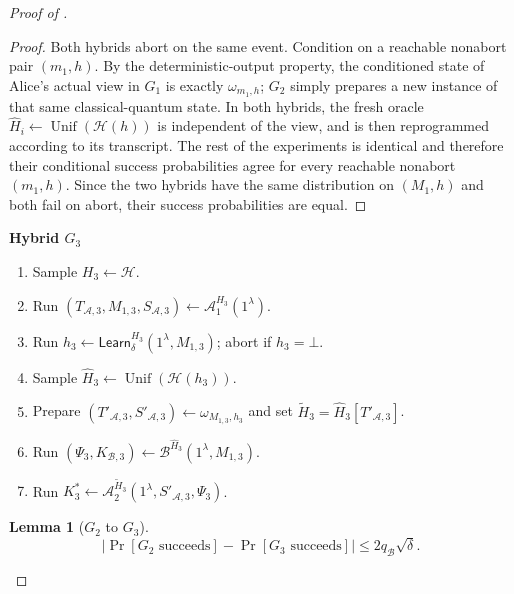 \documentclass[11pt]{article}
\newtheorem{lemma}[lemma]{Lemma}
\newcommand{\cA}{\mathcal{A}}
\newcommand{\cB}{\mathcal{B}}
\newcommand{\cH}{\mathcal{H}}
\newcommand{\Unif}{\operatorname{Unif}}
\newcommand{\Learn}{\mathsf{Learn}}
\newcommand{\changed}[1]{\textcolor{purple!75!black}{#1}}
\newenvironment{hybrid}[1]{%
  \par\medskip
  \noindent\textbf{#1}
  \begin{enumerate}[leftmargin=2.5em,label=\arabic*.,itemsep=0.25em,topsep=0.35em]
}{%
  \end{enumerate}
  \medskip
}
\begin{document}
\begin{proof}[Proof of ]
\begin{proof}
Both hybrids abort on the same event. Condition on a reachable
nonabort pair \((m_1,h)\). By the deterministic-output property, the
conditioned state of Alice's actual view in \(G_1\) is exactly
\(\omega_{m_1,h}\); \(G_2\) simply prepares a new instance of that same
classical-quantum state. In both hybrids, the fresh oracle
\(\widehat H_i\leftarrow\Unif(\cH(h))\) is independent of the view, and is then
reprogrammed according to its transcript. The rest of the experiments is
identical and therefore their conditional success probabilities agree for every
reachable nonabort \((m_1,h)\). Since the two hybrids have the same
distribution on \((M_1,h)\) and both fail on abort, their success probabilities
are equal.
\end{proof}

\begin{hybrid}{Hybrid \(G_3\)}
  \item Sample \(H_3\leftarrow\cH\).
  \item Run
  \((T_{\cA,3},M_{1,3},S_{\cA,3})
  \leftarrow\cA_1^{H_3}(1^\lambda)\).
  \item Run
  \(h_3\leftarrow\Learn_\delta^{H_3}(1^\lambda,M_{1,3})\); abort if
  \(h_3=\bot\).
  \item Sample \(\widehat H_3\leftarrow\Unif(\cH(h_3))\).
  \item Prepare
  \((T'_{\cA,3},S'_{\cA,3})\leftarrow\omega_{M_{1,3},h_3}\) and set
  \(\widetilde H_3=\widehat H_3[T'_{\cA,3}]\).
  \item \changed{Run
  \((\Psi_3,K_{\cB,3})
  \leftarrow\cB^{\widehat H_3}(1^\lambda,M_{1,3})\).}
  \item Run
  \(K^*_3
  \leftarrow\cA_2^{\widetilde H_3}
  (1^\lambda,S'_{\cA,3},\Psi_3)\).
\end{hybrid}

\begin{lemma}[\(G_2\) to \(G_3\)]\label{lem:g2-g3}
\[
  \left|
  \Pr[G_2\text{ succeeds}]
  -
  \Pr[G_3\text{ succeeds}]
  \right|
  \le 2q_{\cB}\sqrt\delta.
\]
\end{lemma}


\end{proof}
\end{document}
